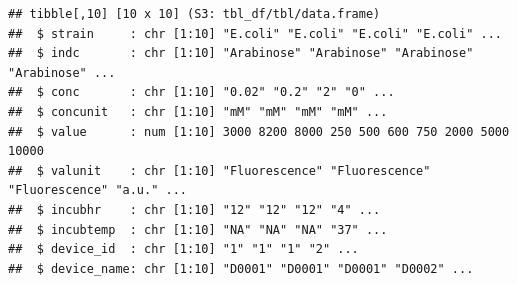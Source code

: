 \documentclass[
]{article}
\newenvironment{Shaded}{\begin{snugshade}}{\end{snugshade}}
\newcommand{\AttributeTok}[1]{\textcolor[rgb]{0.77,0.63,0.00}{#1}}
\newcommand{\ControlFlowTok}[1]{\textcolor[rgb]{0.13,0.29,0.53}{\textbf{#1}}}
\newcommand{\DecValTok}[1]{\textcolor[rgb]{0.00,0.00,0.81}{#1}}
\newcommand{\FunctionTok}[1]{\textcolor[rgb]{0.00,0.00,0.00}{#1}}
\newcommand{\NormalTok}[1]{#1}
\newcommand{\OtherTok}[1]{\textcolor[rgb]{0.56,0.35,0.01}{#1}}
\newcommand{\SpecialCharTok}[1]{\textcolor[rgb]{0.00,0.00,0.00}{#1}}
\newcommand{\StringTok}[1]{\textcolor[rgb]{0.31,0.60,0.02}{#1}}
\begin{document}
\begin{Shaded}
\end{Shaded}

\begin{verbatim}
## tibble[,10] [10 x 10] (S3: tbl_df/tbl/data.frame)
##  $ strain     : chr [1:10] "E.coli" "E.coli" "E.coli" "E.coli" ...
##  $ indc       : chr [1:10] "Arabinose" "Arabinose" "Arabinose" "Arabinose" ...
##  $ conc       : chr [1:10] "0.02" "0.2" "2" "0" ...
##  $ concunit   : chr [1:10] "mM" "mM" "mM" "mM" ...
##  $ value      : num [1:10] 3000 8200 8000 250 500 600 750 2000 5000 10000
##  $ valunit    : chr [1:10] "Fluorescence" "Fluorescence" "Fluorescence" "a.u." ...
##  $ incubhr    : chr [1:10] "12" "12" "12" "4" ...
##  $ incubtemp  : chr [1:10] "NA" "NA" "NA" "37" ...
##  $ device_id  : chr [1:10] "1" "1" "1" "2" ...
##  $ device_name: chr [1:10] "D0001" "D0001" "D0001" "D0002" ...
\end{verbatim}
\end{document}
